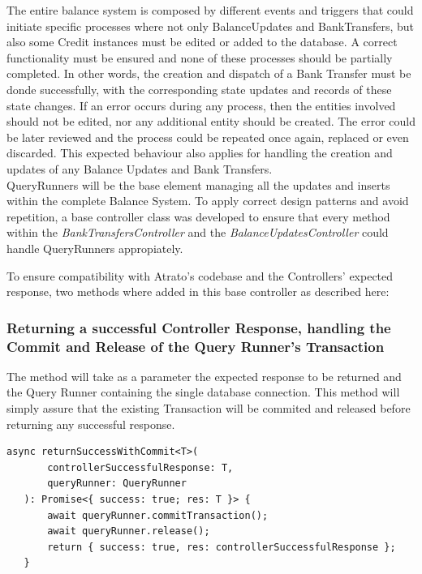 The entire balance system is composed by different events and triggers that could initiate specific processes where not only BalanceUpdates and BankTransfers, but also some Credit instances must be edited or added to the database. A correct functionality must be ensured and none of these processes should be partially completed. In other words, the creation and dispatch of a Bank Transfer must be donde successfully, with the corresponding state updates and records of these state changes. If an error occurs during any process, then the entities involved should not be edited, nor any additional entity should be created. The error could be later reviewed and the process could be repeated once again, replaced or even discarded. This expected behaviour also applies for handling the creation and updates of any Balance Updates and Bank Transfers.\\

QueryRunners will be the base element managing all the updates and inserts within the complete Balance System. To apply correct design patterns and avoid repetition, a base controller class was developed to ensure that every method within the \textit{BankTransfersController} and the \textit{BalanceUpdatesController} could handle QueryRunners appropiately.

To ensure compatibility with Atrato's codebase and the Controllers' expected response, two methods where added in this base controller as described here: 

\subsubsection{Returning a successful Controller Response, handling the Commit and Release of the Query Runner's Transaction}

The method will take as a parameter the expected response to be returned and the Query Runner containing the single database connection. This method will simply assure that the existing Transaction will be commited and released before returning any successful response.

\begin{verbatim}
async returnSuccessWithCommit<T>(
       controllerSuccessfulResponse: T,
       queryRunner: QueryRunner
   ): Promise<{ success: true; res: T }> {
       await queryRunner.commitTransaction();
       await queryRunner.release();
       return { success: true, res: controllerSuccessfulResponse };
   }
\end{verbatim}

